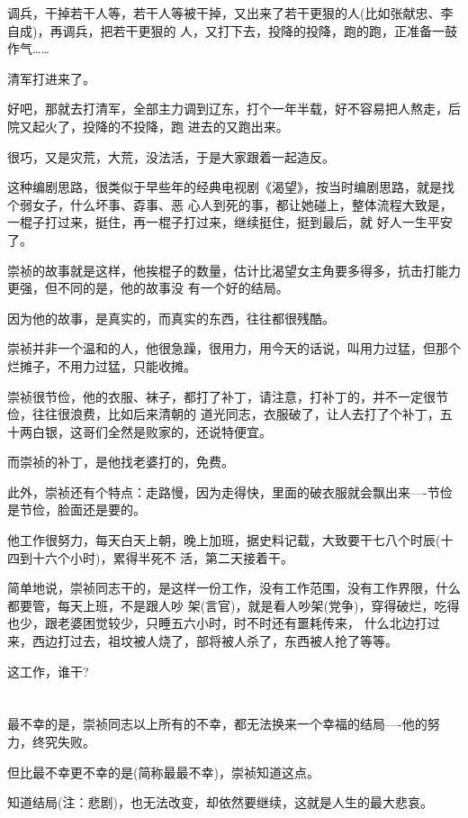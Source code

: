 \documentclass[11pt,a4paper,onecolumn]{article}
\begin{document}
调兵，干掉若干人等，若干人等被干掉，又出来了若干更狠的人(比如张献忠、李自成)，再调兵，把若干更狠的
人，又打下去，投降的投降，跑的跑，正准备一鼓作气……

清军打进来了。

好吧，那就去打清军，全部主力调到辽东，打个一年半载，好不容易把人熬走，后院又起火了，投降的不投降，跑
进去的又跑出来。

很巧，又是灾荒，大荒，没法活，于是大家跟着一起造反。

这种编剧思路，很类似于早些年的经典电视剧《渴望》，按当时编剧思路，就是找个弱女子，什么坏事、孬事、恶
心人到死的事，都让她碰上，整体流程大致是，一棍子打过来，挺住，再一棍子打过来，继续挺住，挺到最后，就
好人一生平安了。

崇祯的故事就是这样，他挨棍子的数量，估计比渴望女主角要多得多，抗击打能力更强，但不同的是，他的故事没
有一个好的结局。

因为他的故事，是真实的，而真实的东西，往往都很残酷。

崇祯并非一个温和的人，他很急躁，很用力，用今天的话说，叫用力过猛，但那个烂摊子，不用力过猛，只能收摊。

崇祯很节俭，他的衣服、袜子，都打了补丁，请注意，打补丁的，并不一定很节俭，往往很浪费，比如后来清朝的
道光同志，衣服破了，让人去打了个补丁，五十两白银，这哥们全然是败家的，还说特便宜。

而崇祯的补丁，是他找老婆打的，免费。

此外，崇祯还有个特点：走路慢，因为走得快，里面的破衣服就会飘出来----节俭是节俭，脸面还是要的。

他工作很努力，每天白天上朝，晚上加班，据史料记载，大致要干七八个时辰(十四到十六个小时)，累得半死不
活，第二天接着干。

简单地说，崇祯同志干的，是这样一份工作，没有工作范围，没有工作界限，什么都要管，每天上班，不是跟人吵
架(言官)，就是看人吵架(党争)，穿得破烂，吃得也少，跟老婆困觉较少，只睡五六小时，时不时还有噩耗传来，
什么北边打过来，西边打过去，祖坟被人烧了，部将被人杀了，东西被人抢了等等。

这工作，谁干?

\section[\thesection]{}

最不幸的是，崇祯同志以上所有的不幸，都无法换来一个幸福的结局----他的努力，终究失败。

但比最不幸更不幸的是(简称最最不幸)，崇祯知道这点。

知道结局(注：悲剧)，也无法改变，却依然要继续，这就是人生的最大悲哀。
\end{document}
